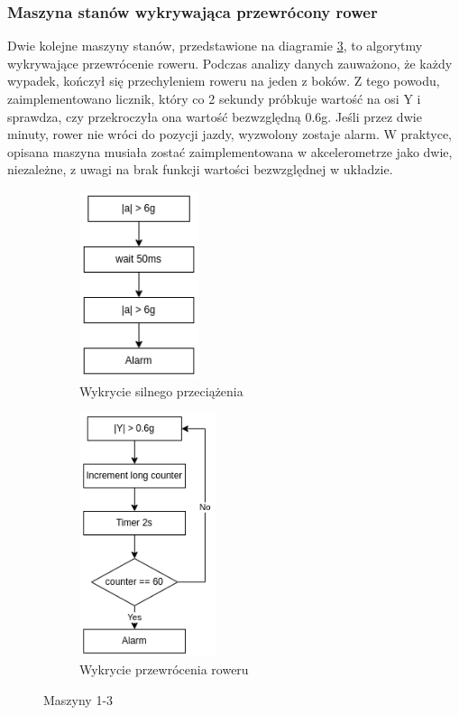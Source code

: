 \subsubsection{Maszyna stanów wykrywająca przewrócony rower}
Dwie kolejne maszyny stanów, przedstawione na diagramie \ref{img:fsm2}, to algorytmy wykrywające przewrócenie roweru. Podczas analizy danych zauważono, że każdy wypadek, kończył się przechyleniem roweru na jeden z boków. Z tego powodu, zaimplementowano licznik, który co 2 sekundy próbkuje wartość na osi Y i sprawdza, czy przekroczyła ona wartość bezwzględną 0.6g. Jeśli przez dwie minuty, rower nie wróci do pozycji jazdy, wyzwolony zostaje alarm. W praktyce, opisana maszyna musiała zostać zaimplementowana w akcelerometrze jako dwie, niezależne, z uwagi na brak funkcji wartości bezwzględnej w układzie.
\begin{figure}[h]
    \centering
    \begin{subfigure}[b]{5cm}
    \centering
    \includegraphics[width=3.5cm]{Graphics/All_axis_FSM1.png}
    \caption{Wykrycie silnego przeciążenia}
    \label{img:fsm1}
    \end{subfigure}%
    \hspace{1cm}
    \begin{subfigure}[b]{5cm}
    \centering
    \includegraphics[width=4cm]{Graphics/overturned_FSM2_3.png}
    \caption{Wykrycie przewrócenia roweru}
    \label{img:fsm2}
    \end{subfigure}
    \caption{Maszyny 1-3}
\end{figure}
